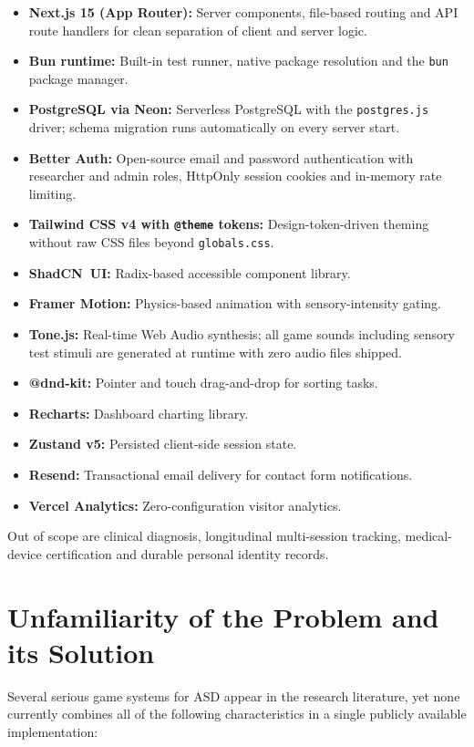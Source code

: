 \documentclass[12pt,a4paper,oneside]{report}
\begin{document}
	\begin{itemize}[leftmargin=0.5in]
		\item \textbf{Next.js 15 (App Router):} Server components, file-based routing and API route handlers for clean separation of client and server logic.
		\item \textbf{Bun runtime:} Built-in test runner, native package resolution and the \texttt{bun} package manager.
		\item \textbf{PostgreSQL via Neon:} Serverless PostgreSQL with the \texttt{postgres.js} driver; schema migration runs automatically on every server start.
		\item \textbf{Better Auth:} Open-source email and password authentication with researcher and admin roles, HttpOnly session cookies and in-memory rate limiting.
		\item \textbf{Tailwind CSS v4 with \texttt{@theme} tokens:} Design-token-driven theming without raw CSS files beyond \texttt{globals.css}.
		\item \textbf{ShadCN~UI:} Radix-based accessible component library.
		\item \textbf{Framer Motion:} Physics-based animation with sensory-intensity gating.
		\item \textbf{Tone.js:} Real-time Web Audio synthesis; all game sounds including sensory test stimuli are generated at runtime with zero audio files shipped.
		\item \textbf{@dnd-kit:} Pointer and touch drag-and-drop for sorting tasks.
		\item \textbf{Recharts:} Dashboard charting library.
		\item \textbf{Zustand v5:} Persisted client-side session state.
		\item \textbf{Resend:} Transactional email delivery for contact form notifications.
		\item \textbf{Vercel Analytics:} Zero-configuration visitor analytics.
	\end{itemize}
	
	Out of scope are clinical diagnosis, longitudinal multi-session tracking, medical-device certification and durable personal identity records.
	
	\section{Unfamiliarity of the Problem and its Solution}
	
	Several serious game systems for ASD appear in the research literature, yet none currently combines all of the following characteristics in a single publicly available implementation:
	
\end{document}
